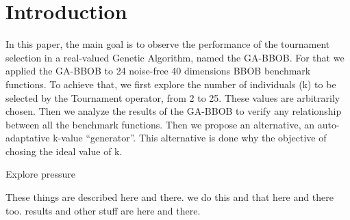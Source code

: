 \section{Introduction}\label{intro}



 In this paper, the main goal is to observe the performance of the tournament selection in a real-valued Genetic Algorithm, named the GA-BBOB. For that we applied the GA-BBOB to 24 noise-free 40 dimensions BBOB benchmark functions. To achieve that, we first explore the number of individuals (k) to be selected by the Tournament operator, from 2 to 25. These values are arbitrarily chosen. Then we analyze the results of the GA-BBOB to verify any relationship between all the benchmark functions. Then we propose an alternative, an auto-adaptative k-value ``generator''. This alternative is done why the objective of chosing the ideal value of k.

Explore pressure

These things are described here and there. we do this and that here and there too. results and other stuff are here and there.